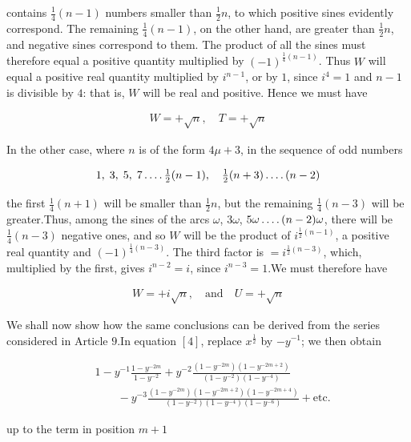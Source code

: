 contains $\frac14(n-1)$ numbers smaller than $\frac12n$, to which positive sines evidently correspond. The remaining $\frac14(n-1)$, on the other hand, are greater than $\frac12n$, and negative sines correspond to them. The product of all the sines must therefore equal a positive quantity multiplied by $(-1)^{\frac14(n-1)}$. Thus $W$ will equal a positive real quantity multiplied by $i^{n-1}$, or by $1$, since $i^4=1$ and $n-1$ is divisible by $4$: that is, $W$ will be real and positive. Hence we must have

\[
\begin{aligned}
W=+\surd n,\quad T=+\surd n
\end{aligned}
\]

In the other case, where $n$ is of the form $4\mu+3$, in the sequence of odd numbers

\[
\begin{aligned}
1,\;3,\;5,\;7\mathinner{.\,.\,.\,.}\tfrac12(n-1),\quad\tfrac12(n+3)\mathinner{.\,.\,.\,.}(n-2)
\end{aligned}
\]

the first $\frac14(n+1)$ will be smaller than $\frac12n$, but the remaining $\frac14(n-3)$ will be greater.\quad Thus, among the sines of the arcs $\omega$, $3\omega$, $5\omega\mathinner{.\,.\,.\,.}(n-2)\omega$, there will be $\frac14(n-3)$ negative ones, and so $W$ will be the product of $i^{\frac12(n-1)}$, a positive real quantity and $(-1)^{\frac14(n-3)}$. The third factor is $=i^{\frac12(n-3)}$, which, multiplied by the first, gives $i^{n-2}=i$, since $i^{n-3}=1$.\quad We must therefore have

\[
\begin{aligned}
W=+i\surd n,\quad\text{and}\quad U=+\surd n
\end{aligned}
\]


We shall now show how the same conclusions can be derived from the series considered in Article $9$.\quad In equation $[4]$, replace $x^{\frac12}$ by $-y^{-1}$; we then obtain


\[
\begin{aligned}
&1-y^{-1}\frac{1-y^{-2m}}{1-y^{-2}}+y^{-2}\frac{(1-y^{-2m})(1-y^{-2m+2})}{(1-y^{-2})(1-y^{-4})}\\&\qquad-y^{-3}\frac{(1-y^{-2m})(1-y^{-2m+2})(1-y^{-2m+4})}{(1-y^{-2})(1-y^{-4})(1-y^{-6})}+\text{etc.}
\end{aligned}
\]

up to the term in position $m+1$

